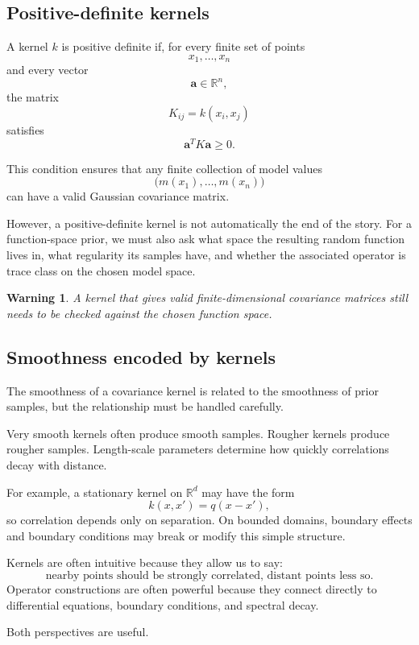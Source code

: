 \documentclass[11pt,a4paper]{book}
\newtheorem{warning}[definition]{Warning}
\newcommand{\R}{\mathbb{R}}
\begin{document}
\subsection{Positive-definite kernels}

A kernel $k$ is positive definite if, for every finite set of points
\[
    x_1,\ldots,x_n
\]
and every vector
\[
    \bm{a}\in\R^n,
\]
the matrix
\[
    K_{ij}=k(x_i,x_j)
\]
satisfies
\[
    \bm{a}^T K\bm{a}\geq 0.
\]

This condition ensures that any finite collection of model values
\[
    \bigl(m(x_1),\ldots,m(x_n)\bigr)
\]
can have a valid Gaussian covariance matrix.

However, a positive-definite kernel is not automatically the end of the story.
For a function-space prior, we must also ask what space the resulting random
function lives in, what regularity its samples have, and whether the associated
operator is trace class on the chosen model space.

\begin{warning}
A kernel that gives valid finite-dimensional covariance matrices still needs
to be checked against the chosen function space.
\end{warning}

\subsection{Smoothness encoded by kernels}

The smoothness of a covariance kernel is related to the smoothness of prior
samples, but the relationship must be handled carefully.

Very smooth kernels often produce smooth samples. Rougher kernels produce
rougher samples. Length-scale parameters determine how quickly correlations
decay with distance.

For example, a stationary kernel on $\R^d$ may have the form
\[
    k(x,x') = q(x-x'),
\]
so correlation depends only on separation. On bounded domains, boundary
effects and boundary conditions may break or modify this simple structure.

Kernels are often intuitive because they allow us to say:
\[
    \text{nearby points should be strongly correlated, distant points less so.}
\]
Operator constructions are often powerful because they connect directly to
differential equations, boundary conditions, and spectral decay.

Both perspectives are useful.
\end{document}
